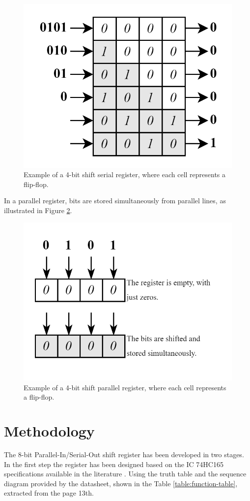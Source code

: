 \documentclass[9pt,technote]{IEEEtran}
\begin{document}
	\begin{figure}[H]
		\includegraphics[width=0.7\columnwidth]{serial_serial_reg}
		\caption{Example of a 4-bit shift serial register, where each cell represents a flip-flop.}
		\label{fig:serialserialreg}
	\end{figure}

	In a parallel register, bits are stored simultaneously from parallel lines, as illustrated in Figure \ref{fig:parallelserialreg}.
	
	\begin{figure}[H]
		\centering
		\includegraphics[width=0.7\columnwidth]{Parallel_serial_reg}
		\caption{Example of a 4-bit shift parallel register, where each cell represents a flip-flop.}
		\label{fig:parallelserialreg}
	\end{figure}
	
	
	
	
	
	\section{Methodology}
	The 8-bit Parallel-In/Serial-Out shift register has been developed in two stages. In the first step the register has been designed based on the IC 74HC165 specifications available in the literature \cite{texas_instruments_sn74hc165}. Using the truth table and the sequence diagram provided by the datasheet, shown in the Table \ref{table:function-table}, extracted from the page 13th.
	
\end{document}
